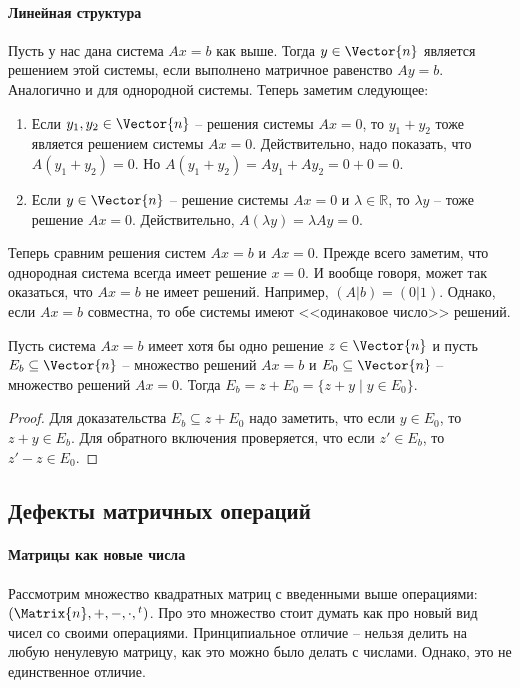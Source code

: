 \paragraph{Линейная структура}
Пусть у нас дана система $Ax = b$ как выше.
Тогда $y\in\Vector{n}$ является решением этой системы, если выполнено матричное равенство $Ay = b$.
Аналогично и для однородной системы.
Теперь заметим следующее:
\begin{enumerate}
\item Если $y_1, y_2\in \Vector{n}$ -- решения системы $Ax = 0$, то $y_1 + y_2$ тоже является решением системы $Ax = 0$.
Действительно, надо показать, что $A(y_1 + y_2) = 0$. Но $A(y_1 + y_2) = A y_1 + Ay_2 = 0 + 0 = 0$.
\item Если $y\in\Vector{n}$ -- решение системы $Ax = 0$ и $\lambda\in \mathbb R$, то $\lambda y$ -- тоже решение $Ax = 0$.
Действительно, $A(\lambda y) = \lambda Ay = 0$. 
\end{enumerate}

Теперь сравним решения систем $Ax = b$ и $Ax = 0$.
Прежде всего заметим, что однородная система всегда имеет решение $x = 0$.
И вообще говоря, может так оказаться, что $Ax = b$ не имеет решений.
Например, $(A|b) = (0|1)$.
Однако, если $Ax = b$ совместна, то обе системы имеют <<одинаковое число>> решений. 

\begin{claim*}
Пусть система $Ax = b$ имеет хотя бы одно решение $z\in\Vector{n}$ и пусть $E_b\subseteq \Vector{n}$ -- множество решений $Ax = b$ и $E_0\subseteq \Vector{n}$ -- множество решений $Ax = 0$. Тогда $E_b = z + E_0 = \{z +y\mid y\in E_0\}$. 
\end{claim*}
\begin{proof}
Для доказательства $E_b \subseteq z + E_0$ надо заметить, что если $y\in E_0$, то $z+y\in E_b$.
Для обратного включения проверяется, что если $z'\in E_b$, то $z' - z\in E_0$.
\end{proof}

\subsection{Дефекты матричных операций}

\paragraph{Матрицы как новые числа}
Рассмотрим множество квадратных матриц с введенными выше операциями: $(\Matrix{n}, +, -, \cdot, {}^t)$.
Про это множество стоит думать как про новый вид чисел со своими операциями.
Принципиальное отличие -- нельзя делить на любую ненулевую матрицу, как это можно было делать с числами.
Однако, это не единственное отличие.

